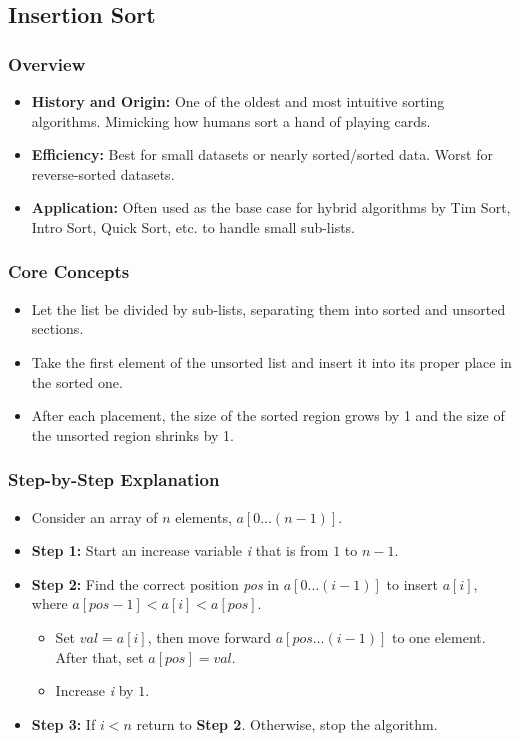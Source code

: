 \subsection[Insertion Sort]{Insertion Sort \cite{ali2021performance}}
    \subsubsection{Overview}
        \begin{itemize}
            \item \textbf{History and Origin:} One of the oldest and most intuitive sorting algorithms. Mimicking how humans sort a hand of playing cards.
            \item \textbf{Efficiency:} Best for small datasets or nearly sorted/sorted data. Worst for reverse-sorted datasets.
            \item \textbf{Application:} Often used as the base case for hybrid algorithms by Tim Sort, Intro Sort, Quick Sort, etc. to handle small sub-lists.
        \end{itemize}
    \subsubsection{Core Concepts}
        \begin{itemize}
            \item Let the list be divided by sub-lists, separating them into sorted and unsorted sections.
            \item Take the first element of the unsorted list and insert it into its proper place in the sorted one.
            \item After each placement, the size of the sorted region grows by 1 and the size of the unsorted region shrinks by 1.
        \end{itemize}

    \subsubsection{Step-by-Step Explanation}
        \begin{itemize}
            \item Consider an array of $n$ elements, $a[0\ldots (n - 1)]$.
            \item \textbf{Step 1:} Start an increase variable \textit{i} that is from $1$ to $n - 1$.
            \item \textbf{Step 2:} Find the correct position \textit{pos} in $a[0\ldots (i - 1)]$ to insert $a[i]$, where $a[pos - 1] < a[i] < a[pos]$.
            \begin{itemize}
                \item Set $val = a[i]$, then move forward $a[pos\ldots (i - 1)]$ to one element. After that, set $a[pos] = val$.
                \item Increase \textit{i} by $1$.
            \end{itemize}
            \item \textbf{Step 3:} If $i < n$ return to \textbf{Step 2}. Otherwise, stop the algorithm. 
        \end{itemize}

